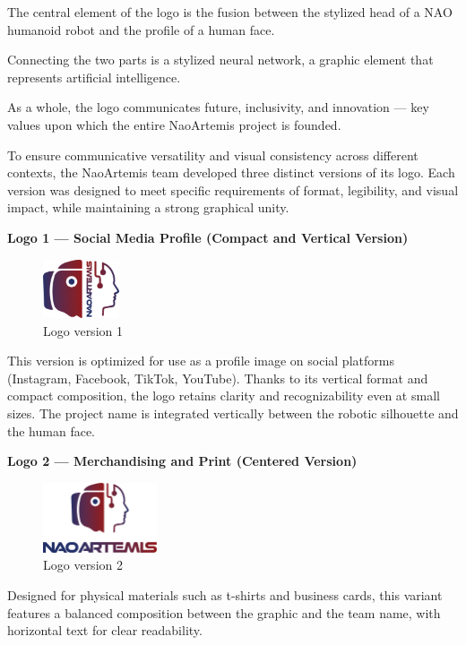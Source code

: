 \documentclass{optica-article}
\begin{document}
The central element of the logo is the fusion between the stylized head of a NAO humanoid robot and the profile of a human face.

Connecting the two parts is a stylized neural network, a graphic element that represents artificial intelligence.

As a whole, the logo communicates future, inclusivity, and innovation — key values upon which the entire NaoArtemis project is founded.

To ensure communicative versatility and visual consistency across different contexts, the NaoArtemis team developed three distinct versions of its logo. Each version was designed to meet specific requirements of format, legibility, and visual impact, while maintaining a strong graphical unity.

\textbf{Logo 1 — Social Media Profile (Compact and Vertical Version)}\\
\begin{figure}[H]
    \centering
    \includegraphics[width=0.2\textwidth]{figures/logo_v1.png}
    \caption{Logo version 1}
    \label{fig:logo_v1}
\end{figure}

This version is optimized for use as a profile image on social platforms (Instagram, Facebook, TikTok, YouTube). Thanks to its vertical format and compact composition, the logo retains clarity and recognizability even at small sizes. The project name is integrated vertically between the robotic silhouette and the human face.

\textbf{Logo 2 — Merchandising and Print (Centered Version)}\\
\begin{figure}[H]
    \centering
    \includegraphics[width=0.3\textwidth]{figures/logo_v2.png}
    \caption{Logo version 2}
    \label{fig:logo_v2}
\end{figure}
Designed for physical materials such as t-shirts and business cards, this variant features a balanced composition between the graphic and the team name, with horizontal text for clear readability.
\end{document}
